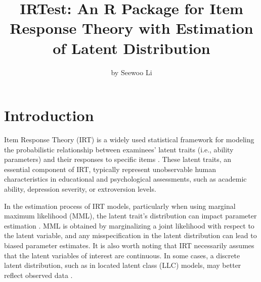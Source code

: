 \title{IRTest: An R Package for Item Response Theory with Estimation of Latent Distribution}


\author{by Seewoo Li}

\maketitle


\hypertarget{introduction}{%
\section{Introduction}\label{introduction}}

Item Response Theory (IRT) is a widely used statistical framework for modeling
the probabilistic relationship between examinees' latent traits
(i.e., ability parameters) and their responses to specific items
\citep{deAyala:2009, Hambleton+Swaminathan+Rogers:1991, vanderLinden:2016}.
These latent traits, an essential component of IRT, typically represent unobservable
human characteristics in educational and psychological assessments,
such as academic ability, depression severity, or extroversion levels.

In the estimation process of IRT models, particularly when using marginal maximum likelihood (MML),
the latent trait's distribution can impact parameter estimation \citep{Woods:2015}.
MML is obtained by marginalizing a joint likelihood with respect to the latent variable,
and any misspecification in the latent distribution can lead to biased parameter estimates.
It is also worth noting that IRT necessarily assumes that the latent variables of interest are continuous.
In some cases, a discrete latent distribution, such as in located latent class (LLC) models,
may better reflect observed data
\citep[see][]{Clogg:1981, Follmann:1988, Haberman:2005, McCutcheon:1987, Xu+vonDavier:2008}.

